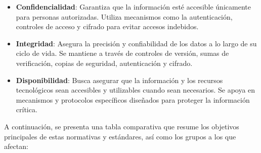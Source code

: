 \documentclass[a4paper, 10pt]{article}
\begin{document}
\begin{itemize}
\item \textbf{Confidencialidad}: Garantiza que la información esté accesible únicamente para personas autorizadas. Utiliza mecanismos como la autenticación, controles de acceso y cifrado para evitar accesos indebidos.
\item \textbf{Integridad}: Asegura la precisión y confiabilidad de los datos a lo largo de su ciclo de vida. Se mantiene a través de controles de versión, sumas de verificación, copias de seguridad, autenticación y cifrado.
\item \textbf{Disponibilidad}: Busca asegurar que la información y los recursos tecnológicos sean accesibles y utilizables cuando sean necesarios. Se apoya en mecanismos y protocolos específicos diseñados para proteger la información crítica.
\end{itemize}
\par\vspace{0.5cm}

A continuación, se presenta una tabla comparativa que resume los objetivos principales de estas normativas y estándares, así como los grupos a los que afectan:
\end{document}
